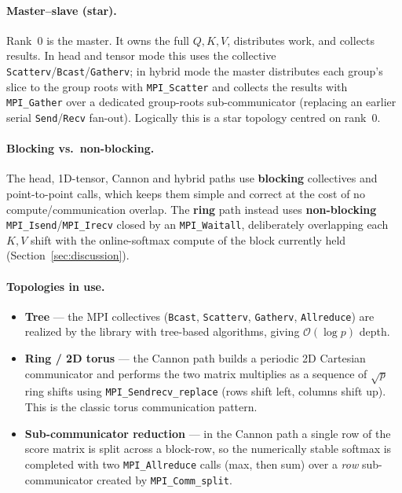 \documentclass[11pt,a4paper]{article}
\newcommand{\code}[1]{\texttt{#1}}
\begin{document}
\paragraph{Master--slave (star).}
Rank~0 is the master. It owns the full $Q,K,V$, distributes work, and collects
results. In head and tensor mode this uses the collective
\code{Scatterv}/\code{Bcast}/\code{Gatherv}; in hybrid mode the master distributes
each group's slice to the group roots with \code{MPI\_Scatter} and collects the
results with \code{MPI\_Gather} over a dedicated group-roots sub-communicator
(replacing an earlier serial \code{Send}/\code{Recv} fan-out). Logically this is a
star topology centred on rank~0.

\paragraph{Blocking vs.\ non-blocking.}
The head, 1D-tensor, Cannon and hybrid paths use \textbf{blocking} collectives and
point-to-point calls, which keeps them simple and correct at the cost of no
compute/communication overlap. The \textbf{ring} path instead uses
\textbf{non-blocking} \code{MPI\_Isend}/\code{MPI\_Irecv} closed by an
\code{MPI\_Waitall}, deliberately overlapping each $K,V$ shift with the
online-softmax compute of the block currently held (Section~\ref{sec:discussion}).

\paragraph{Topologies in use.}
\begin{itemize}[leftmargin=1.4em]
\item \textbf{Tree} --- the MPI collectives (\code{Bcast}, \code{Scatterv},
\code{Gatherv}, \code{Allreduce}) are realized by the library with tree-based
algorithms, giving $\mathcal{O}(\log p)$ depth.
\item \textbf{Ring / 2D torus} --- the Cannon path builds a periodic 2D
Cartesian communicator and performs the two matrix multiplies as a sequence of
$\sqrt{p}$ ring shifts using \code{MPI\_Sendrecv\_replace} (rows shift left,
columns shift up). This is the classic torus communication pattern.
\item \textbf{Sub-communicator reduction} --- in the Cannon path a single row of
the score matrix is split across a block-row, so the numerically stable softmax
is completed with two \code{MPI\_Allreduce} calls (max, then sum) over a
\emph{row} sub-communicator created by \code{MPI\_Comm\_split}.
\end{itemize}
\end{document}
